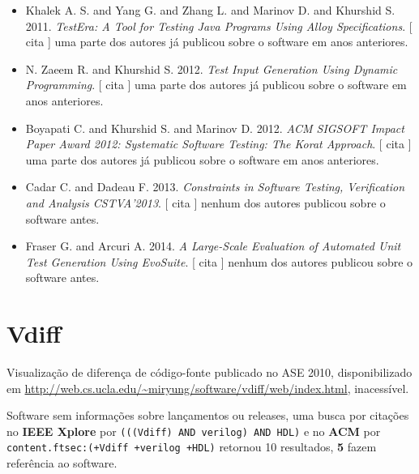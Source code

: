 \begin{itemize}
      [
          cita
      ]
todos os autores já publicaram sobre o software em anos anteriores.
\item Khalek A. S. and Yang G. and Zhang L. and Marinov D. and Khurshid S.
      2011.
        \textit{ TestEra: A Tool for Testing Java Programs Using Alloy Specifications}.
      [
          cita
      ]
uma parte dos autores já publicou sobre o software em anos anteriores.
\item N. Zaeem R. and Khurshid S.
      2012.
        \textit{ Test Input Generation Using Dynamic Programming}.
      [
          cita
      ]
uma parte dos autores já publicou sobre o software em anos anteriores.
\item Boyapati C. and Khurshid S. and Marinov D.
      2012.
        \textit{ ACM SIGSOFT Impact Paper Award 2012: Systematic Software Testing: The Korat Approach}.
      [
          cita
      ]
uma parte dos autores já publicou sobre o software em anos anteriores.
\item Cadar C. and Dadeau F.
      2013.
        \textit{ Constraints in Software Testing, Verification and Analysis CSTVA'2013}.
      [
          cita
      ]
nenhum dos autores publicou sobre o software antes.
\item Fraser G. and Arcuri A.
      2014.
        \textit{ A Large-Scale Evaluation of Automated Unit Test Generation Using EvoSuite}.
      [
          cita
      ]
nenhum dos autores publicou sobre o software antes.
\end{itemize}
\section{Vdiff}

Visualização de diferença de código-fonte
publicado no ASE 2010,
disponibilizado em \url{http://web.cs.ucla.edu/~miryung/software/vdiff/web/index.html},
inacessível.

Software sem informações sobre lançamentos ou releases,
uma busca por citações no {\bf IEEE Xplore} por
\texttt{(((Vdiff) AND verilog) AND HDL)}
e no {\bf ACM} por
\texttt{content.ftsec:(+Vdiff +verilog +HDL)}
retornou
10 resultados,
{\bf 5} fazem referência ao software.

